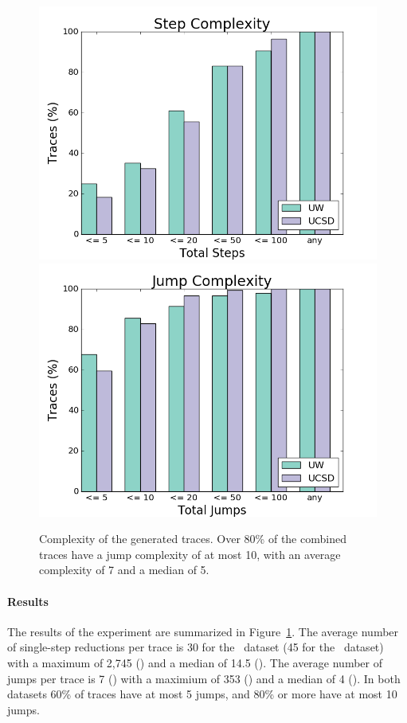 %
\begin{figure}[t]
\includegraphics[width=0.7\linewidth]{nanomaly/trace_size_step.png}
\includegraphics[width=0.7\linewidth]{nanomaly/trace_size_jump.png}
\caption{Complexity of the generated traces. Over 80\% of the combined traces
  have a jump complexity of at most 10, with an average complexity of 7
  and a median of 5.}
\label{fig:results-complexity}
\end{figure}
%
\paragraph{Results}
\label{sec:nanomaly:results-complexity}
The results of the experiment are summarized in
Figure~\ref{fig:results-complexity}.
%
The average number of single-step reductions per trace is 30 for the
\ucsdbench\ dataset (45 for the \uwbench\ dataset) with a maximum of
2,745 () and a median of 14.5 ().
%
The average number of jumps per trace is 7 () with a
maximium of 353 () and a median of 4 ().
%
In both datasets 60\% of traces have at most 5 jumps, and 80\% or more
have at most 10 jumps.


